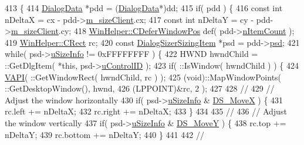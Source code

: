 \begin{DoxyCode}
413 \{
414   \mbox{\hyperlink{struct_dialog_data}{DialogData}} *pdd = (\mbox{\hyperlink{struct_dialog_data}{DialogData}}*)dd;
415   \textcolor{keywordflow}{if}( pdd ) \{
416     \textcolor{keyword}{const} \textcolor{keywordtype}{int} nDeltaX = cx - pdd->\mbox{\hyperlink{struct_dialog_data_af63c4c59aa42a272798f9af446fc4484}{m\_sizeClient}}.cx;
417     \textcolor{keyword}{const} \textcolor{keywordtype}{int} nDeltaY = cy - pdd->\mbox{\hyperlink{struct_dialog_data_af63c4c59aa42a272798f9af446fc4484}{m\_sizeClient}}.cy;
418     \mbox{\hyperlink{class_win_helper_1_1_c_defer_window_pos}{WinHelper::CDeferWindowPos}} def( pdd->\mbox{\hyperlink{struct_dialog_data_acd196414db13af6456bbb413f2d1fa7d}{nItemCount}} );
419     \mbox{\hyperlink{class_win_helper_1_1_c_rect}{WinHelper::CRect}} rc;
420     \textcolor{keyword}{const} \mbox{\hyperlink{struct_dialog_sizer_sizing_item}{DialogSizerSizingItem}} *psd = pdd->\mbox{\hyperlink{struct_dialog_data_aefb399f16dab34e6a2da67716d6147fc}{psd}};
421     \textcolor{keywordflow}{while}( psd->\mbox{\hyperlink{struct_dialog_sizer_sizing_item_af673815342f29c205ec14476c57269c2}{uSizeInfo}} != 0xFFFFFFFF ) \{
422       HWND hwndChild = ::GetDlgItem( *\textcolor{keyword}{this}, psd->\mbox{\hyperlink{struct_dialog_sizer_sizing_item_a2896a44af48c19cab4fb847bcf8fd755}{uControlID}} );
423       \textcolor{keywordflow}{if}( ::IsWindow( hwndChild ) ) \{
424         \mbox{\hyperlink{_win_helper_8h_a5b2d2a39a00a17407c148a7392e32895}{VAPI}}( ::GetWindowRect( hwndChild, rc ) );
425         (void)::MapWindowPoints( ::GetDesktopWindow(),  hwnd,
426                                  (LPPOINT)&rc, 2 );
427         
428         \textcolor{comment}{//}
429         \textcolor{comment}{//      Adjust the window horizontally}
430         \textcolor{keywordflow}{if}( psd->\mbox{\hyperlink{struct_dialog_sizer_sizing_item_af673815342f29c205ec14476c57269c2}{uSizeInfo}} & \mbox{\hyperlink{_resize_dlg_8h_a9f96d817606755d91347bd606825c5af}{DS\_MoveX}} ) \{
431           rc.left += nDeltaX;
432           rc.right += nDeltaX;
433         \}
434         
435         \textcolor{comment}{//}
436         \textcolor{comment}{//      Adjust the window vertically}
437         \textcolor{keywordflow}{if}( psd->\mbox{\hyperlink{struct_dialog_sizer_sizing_item_af673815342f29c205ec14476c57269c2}{uSizeInfo}} & \mbox{\hyperlink{_resize_dlg_8h_ae5309071be822a4dae5cb33a131f6180}{DS\_MoveY}} ) \{
438           rc.top += nDeltaY;
439           rc.bottom += nDeltaY;
440         \}
441         
442         \textcolor{comment}{//}

\end{DoxyCode}

